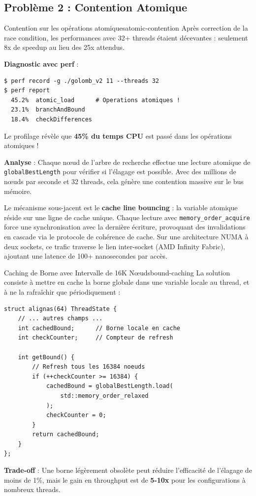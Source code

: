 \documentclass[12pt,a4paper,twoside]{report}
\begin{document}
\subsection{Problème 2 : Contention Atomique}

\begin{probleme}{Contention sur les opérations atomiques}{atomic-contention}
Après correction de la race condition, les performances avec 32+ threads étaient décevantes : seulement 8x de speedup au lieu des 25x attendus.

\textbf{Diagnostic avec perf} :
\begin{verbatim}
$ perf record -g ./golomb_v2 11 --threads 32
$ perf report
  45.2%  atomic_load      # Operations atomiques !
  23.1%  branchAndBound
  18.4%  checkDifferences
\end{verbatim}

Le profilage révèle que \textbf{45\% du temps CPU} est passé dans les opérations atomiques !
\end{probleme}

\textbf{Analyse} : Chaque nœud de l'arbre de recherche effectue une lecture atomique de \texttt{globalBestLength} pour vérifier si l'élagage est possible. Avec des millions de nœuds par seconde et 32 threads, cela génère une contention massive sur le bus mémoire.

Le mécanisme sous-jacent est le \textbf{cache line bouncing} : la variable atomique réside sur une ligne de cache unique. Chaque lecture avec \texttt{memory\_order\_acquire} force une synchronisation avec la dernière écriture, provoquant des invalidations en cascade via le protocole de cohérence de cache. Sur une architecture NUMA à deux sockets, ce trafic traverse le lien inter-socket (AMD Infinity Fabric), ajoutant une latence de 100+ nanosecondes par accès.

\begin{solution}{Caching de Borne avec Intervalle de 16K Nœuds}{bound-caching}
La solution consiste à mettre en cache la borne globale dans une variable locale au thread, et à ne la rafraîchir que périodiquement :

\begin{lstlisting}
struct alignas(64) ThreadState {
    // ... autres champs ...
    int cachedBound;      // Borne locale en cache
    int checkCounter;     // Compteur de refresh

    int getBound() {
        // Refresh tous les 16384 noeuds
        if (++checkCounter >= 16384) {
            cachedBound = globalBestLength.load(
                std::memory_order_relaxed
            );
            checkCounter = 0;
        }
        return cachedBound;
    }
};
\end{lstlisting}

\textbf{Trade-off} : Une borne légèrement obsolète peut réduire l'efficacité de l'élagage de moins de 1\%, mais le gain en throughput est de \textbf{5-10x} pour les configurations à nombreux threads.
\end{solution}
\end{document}

